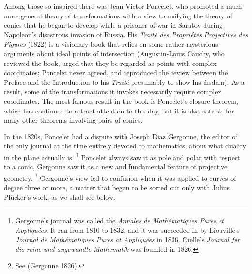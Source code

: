 Among those so inspired there was Jean Victor Poncelet,
%
 who promoted
%
a much more general theory of transformations with a view to unifying
the theory of conics that he began to develop while a prisoner-of-war
in Saratov during Napoleon's disastrous invasion of Russia. His
\emph{Trait\'e des Propri\'et\'es Projectives des Figures} (1822) is a
visionary book that relies on some rather mysterious arguments about ideal
points of intersection (Augustin-Louis Cauchy,
%
 who reviewed the book,
urged that they be regarded as points with complex coordinates;
%
 Poncelet
never agreed, and reproduced the review between the Preface and the
Introduction to his \emph{Trait\'e}  presumably to show his disdain). As
a result, some of the transformations it invokes necessarily require
complex coordinates. The most famous result in the book is Poncelet's
closure theorem,
%
 which has continued to attract attention to this day,
but it is also notable for many other theorems involving pairs of conics.


In the 1820s, Poncelet had a dispute with Joseph Diaz Gergonne,
%
 the editor
of the only journal at the time entirely devoted to mathematics, about
what duality in the plane actually is.%
%
\footnote{Gergonne's journal was
called the \emph{Annales de Math\'ematiques Pures et Appliqu\'ees}. It ran
%
from 1810 to 1832, and  it was succeeded in by Liouville's
%
\emph{Journal
%
de Math\'ematiques Pures at Appliqu\'ees} in 1836. Crelle's
%
\emph{Journal
%
f\"ur die reine und angewandte Mathematik} was founded in 1826.}
%
Poncelet always saw it as pole and polar with respect to a conic,
Gergonne saw it as a new and fundamental feature of projective
%
geometry.%
%
\footnote{See (Gergonne 1826).} 
%
Gergonne's view led to confusion
when it was applied to curves of degree three or more, a matter that began
to be sorted out only with Julius Pl\"ucker's work, as we shall see below.



